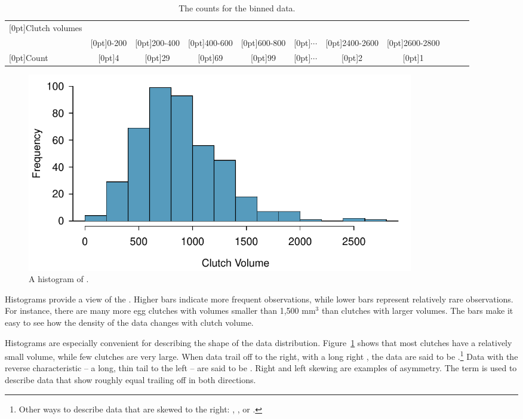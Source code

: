\begin{table}[ht]
	\centering\small
	\begin{tabular}{l ccc ccc ccc c}
		\hline
		\raisebox{-1.5ex}[0pt]{Clutch volumes} & \\
		& \raisebox{1.5ex}[0pt]{0-200} & \raisebox{1.5ex}[0pt]{200-400} & \raisebox{1.5ex}[0pt]{400-600} & \raisebox{1.5ex}[0pt]{600-800} & \raisebox{1.5ex}[0pt]{$\cdots$} & \raisebox{1.5ex}[0pt]{2400-2600} & \raisebox{1.5ex}[0pt]{2600-2800} \\
		\hline
		\raisebox{-.25ex}[0pt]{Count} & \raisebox{-.25ex}[0pt]{4} & \raisebox{-.25ex}[0pt]{29} & \raisebox{-.25ex}[0pt]{69} & \raisebox{-.25ex}[0pt]{99} & \raisebox{-.25ex}[0pt]{$\cdots$} & \raisebox{-.25ex}[0pt]{2} & \raisebox{-.25ex}[0pt]{1} \\
		\hline
	\end{tabular}
	\caption{The counts for the binned  data.}
	\label{frogBinnedClutchVolTable}
\end{table}

\begin{figure}[ht]
	\centering
	\includegraphics[width=0.82\textwidth]{ch_intro_to_data_oi_biostat/figures/frogHist/frogHist}
	\caption{A histogram of .}
	\label{frogHist}
\end{figure}

Histograms provide a view of the . Higher bars indicate more frequent observations, while lower bars represent relatively rare observations. For instance, there are many more egg clutches with volumes smaller than 1,500 $\textrm{mm}^{3}$ than clutches with larger volumes. The bars make it easy to see how the density of the data changes with clutch volume.

Histograms are especially convenient for describing the shape of the data distribution\label{shapeFirstDiscussed}. Figure~\ref{frogHist} shows that most clutches have a relatively small volume, while few clutches are very large. When data trail off to the right, with a long right , the data are said to be .\footnote{Other ways to describe data that are skewed to the right: , , or .} Data with the reverse characteristic -- a long, thin tail to the left -- are said to be . Right and left skewing are examples of asymmetry.  The term  is used to describe data that show roughly equal trailing off in both directions.

